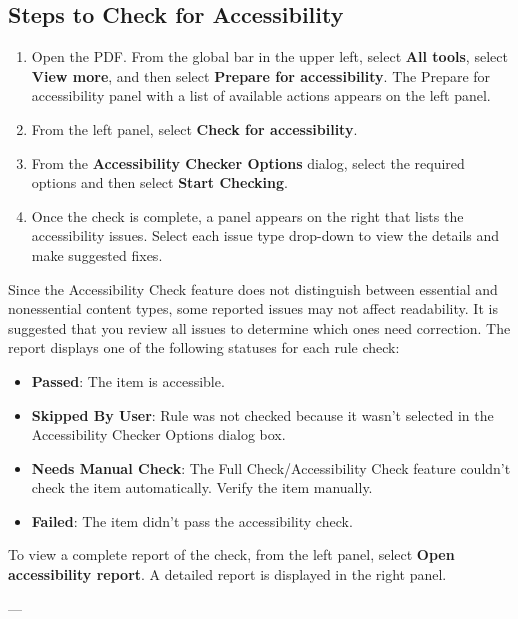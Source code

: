 \subsection*{Steps to Check for Accessibility}
\begin{enumerate}
    \item Open the PDF. From the global bar in the upper left, select \textbf{All tools}, select \textbf{View more}, and then select \textbf{Prepare for accessibility}. The Prepare for accessibility panel with a list of available actions appears on the left panel.
    \item From the left panel, select \textbf{Check for accessibility}.
    \item From the \textbf{Accessibility Checker Options} dialog, select the required options and then select \textbf{Start Checking}.
    \item Once the check is complete, a panel appears on the right that lists the accessibility issues. Select each issue type drop-down to view the details and make suggested fixes.
\end{enumerate}

Since the Accessibility Check feature does not distinguish between essential and nonessential content types, some reported issues may not affect readability. It is suggested that you review all issues to determine which ones need correction. The report displays one of the following statuses for each rule check\footnotemark[1]:
\begin{itemize}
    \item \textbf{Passed}: The item is accessible.
    \item \textbf{Skipped By User}: Rule was not checked because it wasn't selected in the Accessibility Checker Options dialog box.
    \item \textbf{Needs Manual Check}: The Full Check/Accessibility Check feature couldn't check the item automatically. Verify the item manually.
    \item \textbf{Failed}: The item didn't pass the accessibility check.
\end{itemize}
To view a complete report of the check, from the left panel, select \textbf{Open accessibility report}. A detailed report is displayed in the right panel.

---

